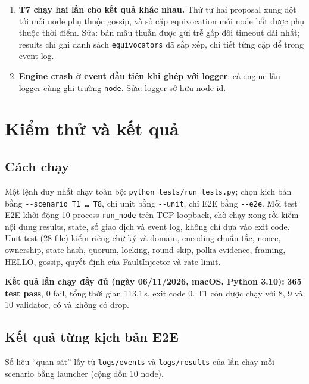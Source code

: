 \documentclass[11pt,a4paper]{article}
\newcommand{\code}[1]{\texttt{#1}}
\begin{document}
\begin{enumerate}[leftmargin=1.5em]
\item \textbf{T7 chạy hai lần cho kết quả khác nhau.} Thứ tự hai proposal xung đột tới mỗi node phụ thuộc gossip, và số cặp equivocation mỗi node bắt được phụ thuộc thời điểm. Sửa: bản mâu thuẫn được gửi trễ gấp đôi timeout dài nhất; results chỉ ghi danh sách \code{equivocators} đã sắp xếp, chi tiết từng cặp để trong event log.
\item \textbf{Engine crash ở event đầu tiên khi ghép với logger}: cả engine lẫn logger cùng ghi trường \code{node}. Sửa: logger sở hữu node id.
\end{enumerate}

\section{Kiểm thử và kết quả}

\subsection{Cách chạy}
Một lệnh duy nhất chạy toàn bộ: \code{python tests/run\_tests.py}; chọn kịch bản bằng \code{-{}-scenario T1 … T8}, chỉ unit bằng \code{-{}-unit}, chỉ E2E bằng \code{-{}-e2e}. Mỗi test E2E khởi động 10 process \code{run\_node} trên TCP loopback, chờ chạy xong rồi kiểm nội dung results, state, số giao dịch và event log, không chỉ dựa vào exit code. Unit test (28 file) kiểm riêng chữ ký và domain, encoding chuẩn tắc, nonce, ownership, state hash, quorum, locking, round-skip, polka evidence, framing, HELLO, gossip, quyết định của FaultInjector và rate limit.

\textbf{Kết quả lần chạy đầy đủ (ngày 06/11/2026, macOS, Python 3.10):} \textbf{365 test pass}, 0 fail, tổng thời gian 113,1\,s, exit code 0. T1 còn được chạy với 8, 9 và 10 validator, có và không có drop.

\subsection{Kết quả từng kịch bản E2E}
Số liệu ``quan sát'' lấy từ \code{logs/events} và \code{logs/results} của lần chạy mỗi scenario bằng launcher (cộng dồn 10 node).
\end{document}
